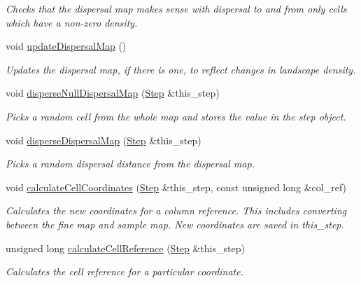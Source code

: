 \begin{DoxyCompactItemize}
\begin{DoxyCompactList}\small\item\em Checks that the dispersal map makes sense with dispersal to and from only cells which have a non-\/zero density. \end{DoxyCompactList}\item 
void \hyperlink{class_dispersal_coordinator_a491225bee8586b2a3f0bf2dcbf747043}{update\+Dispersal\+Map} ()\hypertarget{class_dispersal_coordinator_a491225bee8586b2a3f0bf2dcbf747043}{}\label{class_dispersal_coordinator_a491225bee8586b2a3f0bf2dcbf747043}

\begin{DoxyCompactList}\small\item\em Updates the dispersal map, if there is one, to reflect changes in landscape density. \end{DoxyCompactList}\item 
void \hyperlink{class_dispersal_coordinator_a4bac3aeedb3ceb40601c3db951032d0e}{disperse\+Null\+Dispersal\+Map} (\hyperlink{struct_step}{Step} \&this\+\_\+step)
\begin{DoxyCompactList}\small\item\em Picks a random cell from the whole map and stores the value in the step object. \end{DoxyCompactList}\item 
void \hyperlink{class_dispersal_coordinator_a6605069356e02d1c130b6d68e5d08483}{disperse\+Dispersal\+Map} (\hyperlink{struct_step}{Step} \&this\+\_\+step)
\begin{DoxyCompactList}\small\item\em Picks a random dispersal distance from the dispersal map. \end{DoxyCompactList}\item 
void \hyperlink{class_dispersal_coordinator_af2a3792c5e0bea86fa044c4cd3e5146c}{calculate\+Cell\+Coordinates} (\hyperlink{struct_step}{Step} \&this\+\_\+step, const unsigned long \&col\+\_\+ref)
\begin{DoxyCompactList}\small\item\em Calculates the new coordinates for a column reference. This includes converting between the fine map and sample map. New coordinates are saved in this\+\_\+step. \end{DoxyCompactList}\item 
unsigned long \hyperlink{class_dispersal_coordinator_a737c7f1a06650b467d06a91c0474fb79}{calculate\+Cell\+Reference} (\hyperlink{struct_step}{Step} \&this\+\_\+step)
\begin{DoxyCompactList}\small\item\em Calculates the cell reference for a particular coordinate. \end{DoxyCompactList}\item 

\end{DoxyCompactItemize}
